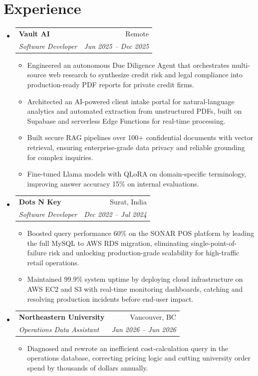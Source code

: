 \documentclass[letterpaper,11pt]{article}
\makeatletter
\newcommand{\resumeItem}[1]{
  \item\small{
    {#1 \vspace{-2pt}}
  }
}
\newcommand{\resumeSubheading}[4]{
  \vspace{-2pt}\item
    \begin{tabular*}{0.97\textwidth}[t]{l@{\extracolsep{\fill}}r}
      \textbf{#1} & #2 \\
      \textit{\small#3} & \textit{\small #4} \\
    \end{tabular*}\vspace{-7pt}
}
\newcommand{\resumeSubHeadingListStart}{\begin{itemize}[leftmargin=0.15in, label={}]}
\newcommand{\resumeSubHeadingListEnd}{\end{itemize}}
\newcommand{\resumeItemListStart}{\begin{itemize}}
\newcommand{\resumeItemListEnd}{\end{itemize}\vspace{-5pt}}
\makeatother
\begin{document}
\section{Experience}
  \resumeSubHeadingListStart
    \resumeSubheading
      {Vault AI}{Remote}
      {Software Developer}{Jun 2025 -- Dec 2025}
      \resumeItemListStart
        \resumeItem{Engineered an autonomous Due Diligence Agent that orchestrates multi-source web research to synthesize credit risk and legal compliance into production-ready PDF reports for private credit firms.}
        \resumeItem{Architected an AI-powered client intake portal for natural-language analytics and automated extraction from unstructured PDFs, built on Supabase and serverless Edge Functions for real-time processing.}
        \resumeItem{Built secure RAG pipelines over 100+ confidential documents with vector retrieval, ensuring enterprise-grade data privacy and reliable grounding for complex inquiries.}
        \resumeItem{Fine-tuned Llama models with QLoRA on domain-specific terminology, improving answer accuracy 15\% on internal evaluations.}
      \resumeItemListEnd
    \resumeSubheading
      {Dots N Key}{Surat, India}
      {Software Developer}{Dec 2022 -- Jul 2024}
      \resumeItemListStart
        \resumeItem{Boosted query performance 60\% on the SONAR POS platform by leading the full MySQL to AWS RDS migration, eliminating single-point-of-failure risk and unlocking production-grade scalability for high-traffic retail operations.}
        \resumeItem{Maintained 99.9\% system uptime by deploying cloud infrastructure on AWS EC2 and S3 with real-time monitoring dashboards, catching and resolving production incidents before end-user impact.}
      \resumeItemListEnd
    \resumeSubheading
      {Northeastern University}{Vancouver, BC}
      {Operations Data Assistant}{Jan 2026 -- Jun 2026}
      \resumeItemListStart
        \resumeItem{Diagnosed and rewrote an inefficient cost-calculation query in the operations database, correcting pricing logic and cutting university order spend by thousands of dollars annually.}
      \resumeItemListEnd
  \resumeSubHeadingListEnd

\end{document}
